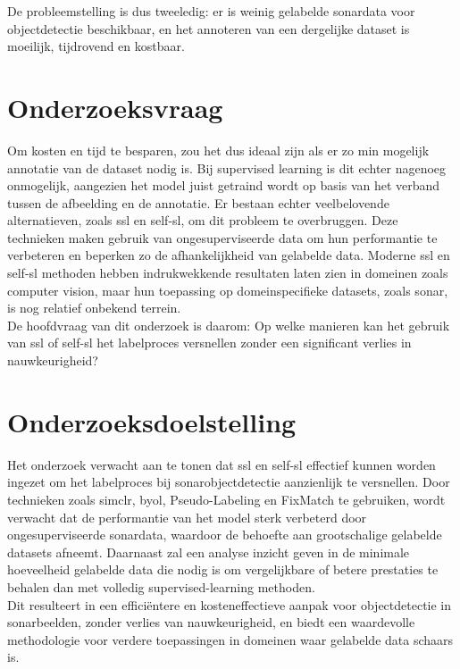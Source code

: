 De probleemstelling is dus tweeledig: er is weinig gelabelde sonardata voor objectdetectie beschikbaar, en het annoteren van een dergelijke dataset is moeilijk, tijdrovend en kostbaar.

\section{Onderzoeksvraag}%
\label{sec:onderzoeksvraag}

Om kosten en tijd te besparen, zou het dus ideaal zijn als er zo min mogelijk annotatie van de dataset nodig is. Bij supervised learning is dit echter nagenoeg onmogelijk, aangezien het model juist getraind wordt op basis van het verband tussen de afbeelding en de annotatie. Er bestaan echter veelbelovende alternatieven, zoals \gls{ssl} en \gls{self-sl}, om dit probleem te overbruggen. Deze technieken maken gebruik van ongesuperviseerde data om hun performantie te verbeteren en beperken zo de afhankelijkheid van gelabelde data. Moderne \gls{ssl} en \gls{self-sl} methoden hebben indrukwekkende resultaten laten zien in domeinen zoals computer vision, maar hun toepassing op domeinspecifieke datasets, zoals sonar, is nog relatief onbekend terrein. \\

De hoofdvraag van dit onderzoek is daarom: Op welke manieren kan het gebruik van \gls{ssl} of \gls{self-sl} het labelproces versnellen zonder een significant verlies in nauwkeurigheid?

\section{Onderzoeksdoelstelling}%
\label{sec:onderzoeksdoelstelling}

Het onderzoek verwacht aan te tonen dat \gls{ssl} en \gls{self-sl} effectief kunnen worden ingezet om het labelproces bij sonarobjectdetectie aanzienlijk te versnellen. Door technieken zoals \gls{simclr}, \gls{byol}, Pseudo-Labeling en FixMatch te gebruiken, wordt verwacht dat de performantie van het model sterk verbeterd door ongesuperviseerde sonardata, waardoor de behoefte aan grootschalige gelabelde datasets afneemt. Daarnaast zal een analyse inzicht geven in de minimale hoeveelheid gelabelde data die nodig is om vergelijkbare of betere prestaties te behalen dan met volledig supervised-learning methoden. \\

Dit resulteert in een efficiëntere en kosteneffectieve aanpak voor objectdetectie in sonarbeelden, zonder verlies van nauwkeurigheid, en biedt een waardevolle methodologie voor verdere toepassingen in domeinen waar gelabelde data schaars is.

